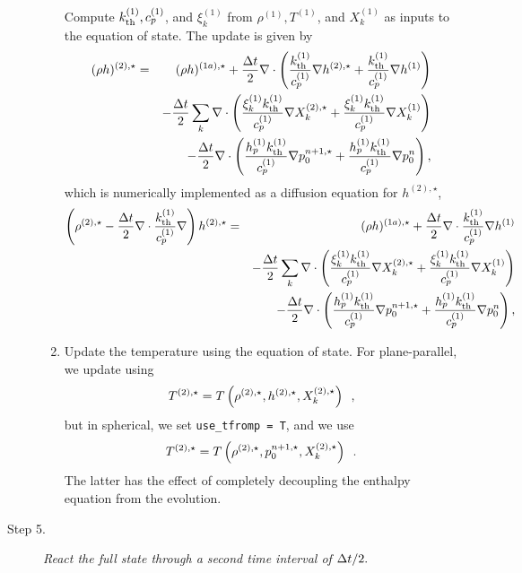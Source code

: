 \begin{description}
\begin{enumerate}
Compute $k_{\rm th}^{(1)}, c_p^{(1)}$, and $\xi_k^{(1)}$ from $\rho^{(1)}, T^{(1)}$, and $X_k^{(1)}$ as inputs to the equation of state.  The update is given by
\begin{eqnarray}
(\rho h)^{(2),\star} &=& (\rho h)^{(1a),\star} + \frac{\Delta t}{2}\nabla\cdot\left(\frac{k_{\rm th}^{(1)}}{c_p^{(1)}}\nabla h^{(2),\star} + \frac{k_{\rm th}^{(1)}}{c_p^{(1)}}\nabla h^{(1)}\right)\nonumber\\
&&- \frac{\Delta t}{2}\sum_k\nabla\cdot\left(\frac{\xi_k^{(1)}k_{\rm th}^{(1)}}{c_p^{(1)}}\nabla X_k^{(2),\star} + \frac{\xi_k^{(1)}k_{\rm th}^{(1)}}{c_p^{(1)}}\nabla X_k^{(1)}\right)\nonumber\\
&&- \frac{\Delta t}{2}\nabla\cdot\left(\frac{h_p^{(1)}k_{\rm th}^{(1)}}{c_p^{(1)}}\nabla p_0^{n+1,\star} + \frac{h_p^{(1)}k_{\rm th}^{(1)}}{c_p^{(1)}}\nabla p_0^{n}\right),
\end{eqnarray}
which is numerically implemented as a diffusion equation for $h^{(2),\star}$,
\begin{eqnarray}
\left(\rho^{(2),\star} - \frac{\Delta t}{2}\nabla\cdot\frac{k_{\rm th}^{(1)}}{c_p^{(1)}}\nabla\right)h^{(2),\star} &=& (\rho h)^{(1a),\star} + \frac{\Delta t}{2}\nabla\cdot\frac{k_{\rm th}^{(1)}}{c_p^{(1)}}\nabla h^{(1)}\nonumber\\
&&- \frac{\Delta t}{2}\sum_k\nabla\cdot\left(\frac{\xi_k^{(1)}k_{\rm th}^{(1)}}{c_p^{(1)}}\nabla X_k^{(2),\star} + \frac{\xi_k^{(1)}k_{\rm th}^{(1)}}{c_p^{(1)}}\nabla X_k^{(1)}\right)\nonumber\\
&&- \frac{\Delta t}{2}\nabla\cdot\left(\frac{h_p^{(1)}k_{\rm th}^{(1)}}{c_p^{(1)}}\nabla p_0^{n+1,\star} + \frac{h_p^{(1)}k_{\rm th}^{(1)}}{c_p^{(1)}}\nabla p_0^{n}\right),
\end{eqnarray}
\item Update the temperature using the equation of state.  For plane-parallel,
we update using
\begin{equation}
T^{(2),\star} = T\left(\rho^{(2),\star}, h^{(2),\star}, X_k^{(2),\star}\right) \enskip ,
\end{equation}
but in spherical, we set {\tt use\_tfromp = T}, and we use
\begin{equation}
T^{(2),\star} = T\left(\rho^{(2),\star}, p_0^{n+1,\star}, X_k^{(2),\star}\right) \enskip .
\end{equation}
The latter has the effect of completely decoupling the enthalpy equation from the 
evolution.

\end{enumerate}

\item[Step 5.] {\em React the full state through a second time interval of $\Delta t / 2.$}


\end{description}
